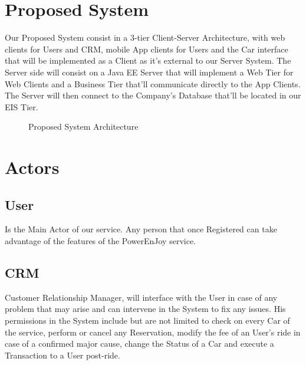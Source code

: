 \documentclass[a4paper]{article}
\begin{document}
\newpage
\section{Proposed System}
\label{sec:propSystem}
Our Proposed System consist in a 3-tier Client-Server Architecture, with web clients for Users and CRM, mobile App clients for Users and the Car interface that will be implemented as a Client as it's external to our Server System. The Server side will consist on a Java EE Server that will implement a Web Tier for Web Clients and a Business Tier that'll communicate directly to the App Clients. The Server will then connect to the Company's Database that'll be located in our EIS Tier.
\begin{figure}[h]
\centering
\vspace*{\fill}
\noindent{}%
\caption {Proposed System Architecture}
\vspace*{0.5cm}
\end{figure}
\newpage

\section{Actors}
\subsection{User}
Is the Main Actor of our service. Any person that once Registered can take advantage of the features of the PowerEnJoy service.
\subsection {CRM}
Customer Relationship Manager, will interface with the User in case of any problem that may arise and can intervene in the System to fix any issues. His permissions in the System include but are not limited to check on every Car of the service, perform or cancel any Reservation, modify the fee of an User's ride in case of a confirmed major cause, change the Status of a Car and execute a Transaction to a User post-ride.
\end{document}
